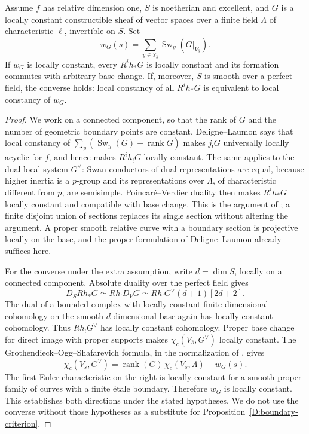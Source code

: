 \begin{proposition}\label{D:curve-Swan}
Assume $f$ has relative dimension one, $S$ is noetherian and excellent,
and $G$ is a locally constant constructible sheaf of vector spaces over
a finite field $\Lambda$ of characteristic $\ell$, invertible on $S$.
Set
\[
 w_G(s)=\sum_{y\in Y_{\bar s}}\operatorname{Sw}_y(G|_{V_{\bar s}}).
\]
If $w_G$ is locally constant, every $R^i h_*G$ is locally constant
and its formation commutes with arbitrary base change. If, moreover,
$S$ is smooth over a perfect field, the converse holds: local constancy
of all $R^i h_*G$ is equivalent to local constancy of $w_G$.
\end{proposition}
\begin{proof}
We work on a connected component, so that the rank of $G$ and the
number of geometric boundary points are constant. Deligne--Laumon
\cite[Theorem 2.1.1, Corollary 2.1.2, Remark 2.1.3,
pp. 185--187]{Laumon1981} says that local constancy of
$\sum_y(\operatorname{Sw}_y(G)+\operatorname{rank}G)$ makes
$j_!G$ universally locally acyclic for $f$, and hence makes
$R^i h_!G$ locally constant. The same applies to the dual local
system $G^\vee$: Swan conductors of dual representations are equal,
because higher inertia is a $p$-group and its representations over
$\Lambda$, of characteristic different from $p$, are semisimple.
Poincar\'e--Verdier duality then makes $R^i h_*G$ locally constant
and compatible with base change. This is the argument of
\cite[Corollary 2.3 and its proof]{Achinger2017}; a finite disjoint
union of sections replaces its single section without altering the
argument. A proper smooth relative curve with a boundary section is
projective locally on the base, and the proper formulation of
Deligne--Laumon already suffices here.

For the converse under the extra assumption, write $d=\dim S$,
locally on a connected component. Absolute duality over the perfect
field gives
\[
 D_S Rh_*G\simeq Rh_!D_VG
             \simeq Rh_!G^\vee(d+1)[2d+2].
\]
The dual of a bounded complex with locally constant finite-dimensional
cohomology on the smooth $d$-dimensional base again has locally
constant cohomology. Thus $Rh_!G^\vee$ has locally constant
cohomology. Proper base change for direct image with proper supports
makes $\chi_c(V_{\bar s},G^\vee)$ locally constant. The
Grothendieck--Ogg--Shafarevich formula, in the normalization of
\cite[\S1.2.1, pp. 178--179]{Laumon1981}, gives
\[
 \chi_c(V_{\bar s},G^\vee)=
 \operatorname{rank}(G)\,\chi_c(V_{\bar s},\Lambda)-w_G(s).
\]
The first Euler characteristic on the right is locally constant for
a smooth proper family of curves with a finite \'etale boundary.
Therefore $w_G$ is locally constant. This establishes both directions
under the stated hypotheses. We do not use the converse without those
hypotheses as a substitute for Proposition~\ref{D:boundary-criterion}.
\end{proof}

